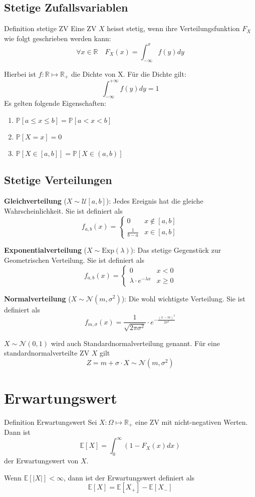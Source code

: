 \documentclass[a4paper,10pt]{article}
\def\R{\mathbb{R}}
\def\P{\mathbb{P}}
\def\E{\mathbb{E}}
\begin{document}
\subsection{Stetige Zufallsvariablen}
\begin{subbox}{Definition stetige ZV}
    Eine ZV \(X\) heisst stetig, wenn ihre Verteilungsfunktion \(F_X\) wie folgt geschrieben werden kann:
    \[\forall x \in \R \quad F_X(x) = \int_{-\infty}^x f(y)dy\]
\end{subbox}
Hierbei ist \(f: \R \mapsto \R_+\) die Dichte von X. Für die Dichte gilt:
\[\int_{-\infty}^{+\infty}f(y)dy = 1\]
Es gelten folgende Eigenschaften:
\begin{enumerate}
    \item \(\P[a \le x \le b] = \P[a < x < b]\)
    \item \(\P[X=x] = 0\)
    \item \(\P[X \in [a,b]] = \P[X \in (a,b)]\)
\end{enumerate}

\subsection{Stetige Verteilungen}
\textbf{Gleichverteilung} (\(X \sim \mathcal{U}[a,b]\)): Jedes Ereignis hat die gleiche Wahrscheinlichkeit. Sie ist definiert als
\[f_{a,b}(x) = \begin{cases}
        0             & x \notin [a,b] \\
        \frac{1}{b-a} & x \in [a,b]
    \end{cases}\]

\noindent \textbf{Exponentialverteilung} (\(X \sim \text{Exp}(\lambda)\)): Das stetige Gegenstück zur Geometrischen Verteilung. Sie ist definiert als
\[f_{a,b}(x) = \begin{cases}
        0                            & x < 0    \\
        \lambda \cdot e^{-\lambda x} & x \geq 0
    \end{cases}\]

\noindent \textbf{Normalverteilung} (\(X \sim \mathcal{N}(m, \sigma^2)\)): Die wohl wichtigste Verteilung. Sie ist definiert als
\[f_{m, \sigma}(x) = \frac{1}{\sqrt{2 \pi \sigma^2}} \cdot e^{-\frac{(x-m)^2}{2 \sigma^2}}\]

\(X \sim \mathcal{N}(0,1)\) wird auch Standardnormalverteilung genannt. Für eine standardnormalverteilte ZV \(X\) gilt
\[Z = m +\sigma \cdot X \sim \mathcal{N}(m, \sigma^2)\]

\section{Erwartungswert}
\begin{mainbox}{Definition Erwartungswert}
    Sei \(X: \Omega \mapsto \R_+\) eine ZV mit nicht-negativen Werten. Dann ist
    \[\E[X] = \int_0^\infty (1- F_X(x)dx)\]
    der Erwartungswert von \(X\).
\end{mainbox}
Wenn \(\E[|X|] < \infty\), dann ist der Erwartungswert definiert als
\[\E[X] = \E[X_+] - \E[X_-]\]
\end{document}
